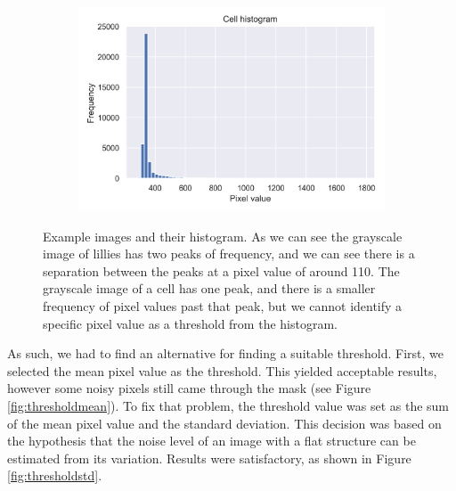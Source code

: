 \begin{figure}[h]
\begin{subfigure}{0.5\textwidth}
        \centering
        \includegraphics[width=.45\textwidth]{dissertation/figures/cell_histogram.png}
    \end{subfigure}
    \caption{Example images and their histogram. As we can see the grayscale image of lillies has two peaks of frequency, and we can see there is a separation between the peaks at a pixel value of around 110. The grayscale image of a cell has one peak, and there is a smaller frequency of pixel values past that peak, but we cannot identify a specific pixel value as a threshold from the histogram.}
    \label{fig:thresholdhist}
\end{figure}
As such, we had to find an alternative for finding a suitable threshold. First, we selected the mean pixel value as the threshold. This yielded acceptable results, however some noisy pixels still came through the mask (see Figure \ref{fig:thresholdmean}). To fix that problem, the threshold value was set as the sum of the mean pixel value and the standard deviation. This decision was based on the hypothesis that the noise level of an image with a flat structure can be estimated from its variation. Results were satisfactory, as shown in Figure \ref{fig:thresholdstd}.

